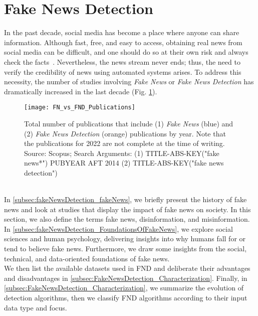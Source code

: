 \section{Fake News Detection}
\label{sec:fakeNewsDetection}
In the past decade, social media has become a place where anyone can share information. Although fast, free, and easy to access, obtaining real news from social media can be difficult, and one should do so at their own risk and always check the facts~\parencite{SocialMediaAndFakeNewsIn2016Election_Allcott,TheScienceOfFakeNews_Lazer}. Nevertheless, the news stream never ends; thus, the need to verify the credibility of news using automated systems arises. To address this necessity, the number of studies involving \emph{Fake News} or \emph{Fake News Detection} has dramatically increased in the last decade (Fig. \ref{fig:FN_vs_FND_Publications}).
\begin{figure}
    \centering
    \texttt{[image: FN\_vs\_FND\_Publications]}
    \caption[Fake News and Fake News Detection Publications by Year.]{Total number of publications that include (1) \emph{Fake News} (blue) and (2) \emph{Fake News Detection} (orange) publications by year. Note that the publications for 2022 are not complete at the time of writing. Source: Scopus; Search Arguments: (1) TITLE-ABS-KEY("fake news*") PUBYEAR AFT 2014 (2) TITLE-ABS-KEY("fake news detection")}\label{fig:FN_vs_FND_Publications}
\end{figure}\\
In \ref{subsec:fakeNewsDetection_fakeNews}, we briefly present the history of fake news and look at studies that display the impact of fake news on society. In this section, we also define the terms fake news, disinformation, and misinformation. \\
In \ref{subsec:fakeNewsDetection_FoundationsOfFakeNews}, we explore social sciences and human psychology, delivering insights into why humans fall for or tend to believe fake news. Furthermore, we draw some insights from the social, technical, and data-oriented foundations of fake news.\\
We then list the available datasets used in FND and deliberate their advantages and disadvantages in \ref{subsec:FakeNewsDetection_Characterization}. Finally, in \ref{subsec:FakeNewsDetection_Characterization}, we summarize the evolution of detection algorithms, then we classify FND algorithms according to their input data type and focus.

